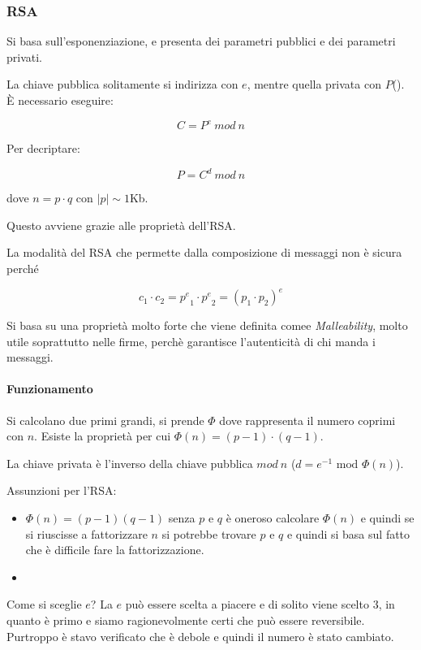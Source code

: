 \subsubsection{RSA}

Si basa sull'esponenziazione, e presenta dei parametri pubblici e dei parametri 
privati.


La chiave pubblica solitamente si indirizza con $e$, mentre quella privata con 
$P$(). È necessario eseguire:

\[ C = P^e\ mod\ n \]

Per decriptare:

\[ P = C^d\ mod\ n \]

dove $n = p \cdot q$ con $|p| \sim 1$Kb.

Questo avviene grazie alle proprietà dell'RSA.

La modalità del RSA che permette dalla composizione di messaggi non è sicura 
perché

\[ c_1 \cdot c_2 = {p^e}_1 \cdot {p^e}_2 = (p_1 \cdot p_2)^e\]


Si basa su una proprietà molto forte che viene definita comee 
\textit{Malleability}, molto utile soprattutto nelle firme, perchè garantisce 
l'autenticità di chi manda i messaggi.


\paragraph{Funzionamento}

Si calcolano due primi grandi, si prende $\Phi$ dove rappresenta il numero 
coprimi con $n$.
Esiste la proprietà per cui $\Phi(n) = (p-1) \cdot (q-1)$.

La chiave privata è l'inverso della chiave pubblica $mod\ n$ ($d = e^{-1}  
\text{ mod } \Phi(n)$).

Assunzioni per l'RSA:
\begin{itemize}
	\item {} $\Phi(n) = (p-1)(q-1)$ senza $p$ e $q$ è 
oneroso calcolare $\Phi(n)$ e quindi se si riuscisse a fattorizzare $n$ si 
potrebbe trovare $p$ e $q$ e quindi si basa sul fatto che è difficile fare la 
fattorizzazione.
    \item {}
\end{itemize}


Come si sceglie $e$? La $e$ può essere scelta a piacere e di solito viene scelto 
$3$, in quanto è primo e siamo ragionevolmente certi che può essere reversibile. 
Purtroppo è stavo verificato che è debole e quindi il numero è stato cambiato.

